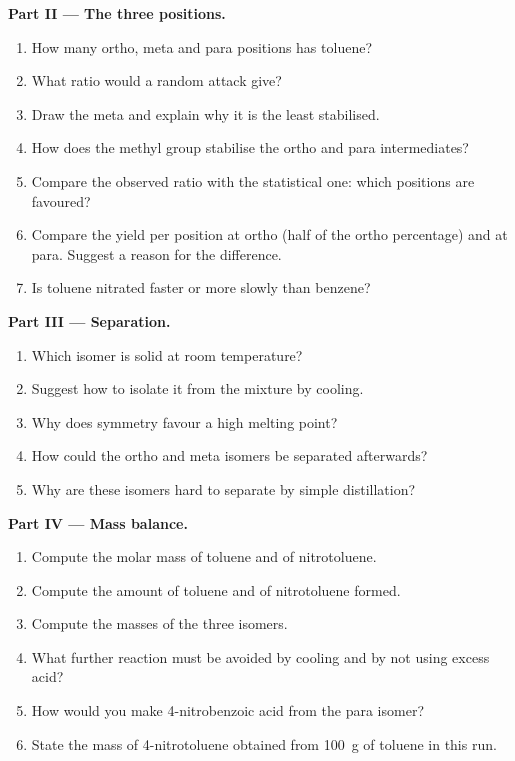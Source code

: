 \begin{problem}
\medskip
\noindent\textbf{Part II --- The three positions.}
\begin{enumerate}[resume]
  \item How many ortho, meta and para positions has toluene?
  \item What ratio would a random attack give?
  \item Draw the meta  and explain why it is the least stabilised.
  \item How does the methyl group stabilise the ortho and para intermediates?
  \item Compare the observed ratio with the statistical one: which positions are favoured?
  \item Compare the yield per position at ortho (half of the ortho percentage) and at para.
        Suggest a reason for the difference.
  \item Is toluene nitrated faster or more slowly than benzene?
\end{enumerate}

\medskip
\noindent\textbf{Part III --- Separation.}
\begin{enumerate}[resume]
  \item Which isomer is solid at room temperature?
  \item Suggest how to isolate it from the mixture by cooling.
  \item Why does symmetry favour a high melting point?
  \item How could the ortho and meta isomers be separated afterwards?
  \item Why are these isomers hard to separate by simple distillation?
\end{enumerate}

\medskip
\noindent\textbf{Part IV --- Mass balance.}
\begin{enumerate}[resume]
  \item Compute the molar mass of toluene and of nitrotoluene.
  \item Compute the amount of toluene and of nitrotoluene formed.
  \item Compute the masses of the three isomers.
  \item What further reaction must be avoided by cooling and by not using excess acid?
  \item How would you make 4-nitrobenzoic acid from the para isomer?
  \item State the mass of 4-nitrotoluene obtained from \qty{100}{g} of toluene in this run.
\end{enumerate}
\end{problem}
